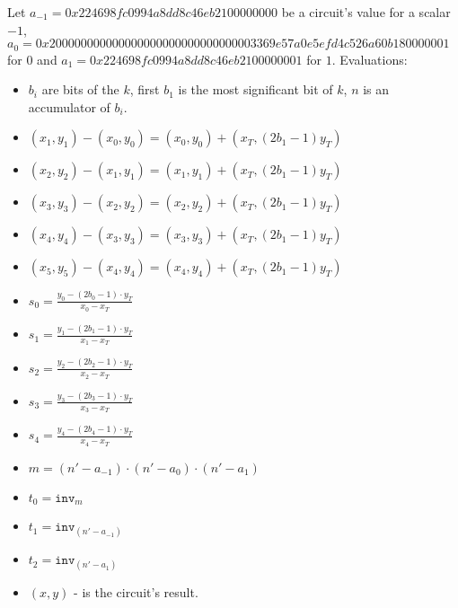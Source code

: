 Let $a_{-1} = 0x224698fc0994a8dd8c46eb2100000000$ be a circuit's value for a scalar $-1$, $a_0 = 0x200000000000000000000000000000003369e57a0e5efd4c526a60b180000001$ for $0$ and $a_1 = 0x224698fc0994a8dd8c46eb2100000001$ for $1$. 
Evaluations:
\begin{itemize}
	\item $b_i$ are bits of the $k$, first $b_1$ is the most significant bit of $k$, $n$ is an accumulator of $b_i$.
	\item $(x_1, y_1) - (x_0, y_0) = (x_0, y_0) + (x_T, (2b_1 - 1)y_T)$
	\item $(x_2, y_2) - (x_1, y_1) = (x_1, y_1) + (x_T, (2b_1 - 1)y_T)$
	\item $(x_3, y_3) - (x_2, y_2) = (x_2, y_2) + (x_T, (2b_1 - 1)y_T)$
	\item $(x_4, y_4) - (x_3, y_3) = (x_3, y_3) + (x_T, (2b_1 - 1)y_T)$
	\item $(x_5, y_5) - (x_4, y_4) = (x_4, y_4) + (x_T, (2b_1 - 1)y_T)$
	\item $s_0 = \frac{y_0 - (2b_0 - 1) \cdot y_T}{x_0 - x_T}$
	\item $s_1 = \frac{y_1 - (2b_1 - 1) \cdot y_T}{x_1 - x_T}$
	\item $s_2 = \frac{y_2 - (2b_2 - 1) \cdot y_T}{x_2 - x_T}$
	\item $s_3 = \frac{y_3 - (2b_3 - 1) \cdot y_T}{x_3 - x_T}$
	\item $s_4 = \frac{y_4 - (2b_4 - 1) \cdot y_T}{x_4 - x_T}$
	\item $m = (n' - a_{-1})\cdot(n' - a_0)\cdot(n' - a_1)$
     \item $t_0 = \texttt{inv}_m$
     \item $t_1 = \texttt{inv}_(n' - a_{-1})$
     \item $t_2 = \texttt{inv}_(n'- a_1)$
     \item $(x,y)$ - is the circuit's result.
	
\end{itemize}

